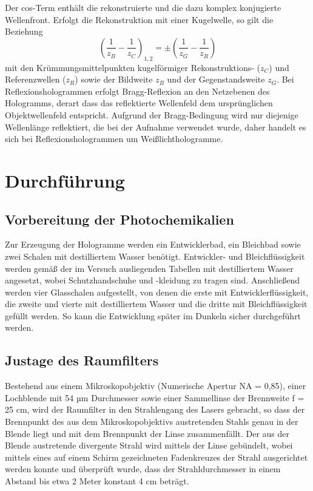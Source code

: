 \documentclass[bigchapter,colorback,accentcolor=tud4b,linedtoc,11pt]{tudreport}
\begin{document}
Der cos-Term enthält die rekonstruierte und die dazu komplex konjugierte Wellenfront. Erfolgt die Rekonstruktion mit einer Kugelwelle, so gilt die Beziehung
$$\left( \frac{1}{z_B}- \frac{1}{z_C} \right)_{1,2} = \pm \left( \frac{1}{z_G}- \frac{1}{z_R} \right) $$
mit den Krümmungsmittelpunkten kugelförmiger Rekonstruktions- ($z_C$) und Referenzwellen ($z_R$) sowie der Bildweite $z_B$ und der Gegenstandsweite $z_G$. 
Bei Reflexionshologrammen erfolgt Bragg-Reflexion an den Netzebenen des Hologramms, derart dass das reflektierte Wellenfeld dem ursprünglichen Objektwellenfeld entspricht. Aufgrund der Bragg-Bedingung wird nur diejenige Wellenlänge reflektiert, die bei der Aufnahme verwendet wurde, daher handelt es sich bei Reflexionshologrammen um Weißlichthologramme.

\chapter{Durchführung}

\section{Vorbereitung der Photochemikalien}

Zur Erzeugung der Hologramme werden ein Entwicklerbad, ein Bleichbad sowie zwei Schalen mit destilliertem Wasser benötigt. Entwickler- und Bleichflüssigkeit werden gemäß der im Versuch ausliegenden Tabellen mit destilliertem Wasser angesetzt, wobei Schutzhandschuhe und -kleidung zu tragen sind. Anschließend werden vier Glasschalen aufgestellt, von denen die erste mit Entwicklerflüssigkeit, die zweite und vierte mit destilliertem Wasser und die dritte mit Bleichflüssigkeit gefüllt werden. So kann die Entwicklung später im Dunkeln sicher durchgeführt werden.

\section{Justage des Raumfilters}

Bestehend aus einem Mikroskopobjektiv (Numerische Apertur NA = 0,85), einer Lochblende mit 54 µm Durchmesser sowie einer Sammellinse der Brennweite f = 25 cm, wird der Raumfilter in den Strahlengang des Lasers gebracht, so dass der Brennpunkt des aus dem Mikroskopobjektivs austretenden Stahls genau in der Blende liegt und mit dem Brennpunkt der Linse zusammenfällt. Der aus der Blende austretende divergente Strahl wird mittels der Linse gebündelt, wobei mittels eines auf einem Schirm gezeichneten Fadenkreuzes der Strahl ausgerichtet werden konnte und überprüft wurde, dass der Strahldurchmesser in einem Abstand bis etwa 2 Meter konstant 4 cm beträgt.
\end{document}
